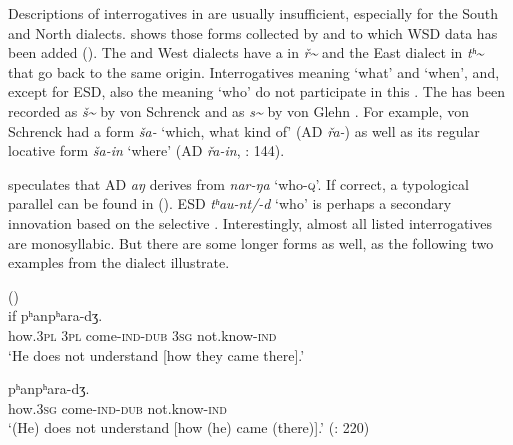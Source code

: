 Descriptions of interrogatives in  are usually insufficient, especially for the South and North  dialects.  shows those forms collected by \citet{Mattissen2003} and \citet{Fortescue2016} to which WSD data has been added (\citealt{ShiraishiTangiku2013}). The  and West  dialects have a  in \textit{ř{\textasciitilde}} and the East  dialect in \textit{tʰ}\textit{{\textasciitilde}} that go back to the same origin. Interrogatives meaning ‘what’ and ‘when’, and, except for ESD, also the  meaning ‘who’ do not participate in this . The  has been recorded as \textit{š{\textasciitilde}} by von Schrenck and as \textit{s{\textasciitilde}} by von Glehn \citep{Grube1892}. For example, von Schrenck had a form \textit{ša-} ‘which, what kind of’ (AD \textit{řa-}) as well as its regular locative form \textit{ša-in} ‘where’ (AD \textit{řa-in}, \citealt{Fortescue2011}: 144).

\citet[111]{Fortescue2016} speculates that AD \textit{aŋ} derives from \textit{nar-ŋa} ‘who-\textsc{q}’. If correct, a typological parallel can be found in  ().  ESD \textit{tʰ}\textit{au-nt/-d} ‘who’ is perhaps a secondary innovation based on the selective . Interestingly, almost all listed interrogatives are monosyllabic. But there are some longer forms as well, as the following two examples from the  dialect illustrate.

\ea%
    \label{ex:amur:12}
     ()\\
    \ea
     if  pʰanpʰara-dʒ.\\
    how.3\textsc{pl}  3\textsc{pl}  come-\textsc{ind}-\textsc{dub}    3\textsc{sg}  not.know-\textsc{ind}\\
    \glt ‘He does not understand [how they came there].’

    \ex
     pʰanpʰara-dʒ.\\
    how.3\textsc{sg}  come-\textsc{ind}-\textsc{dub}    not.know-\textsc{ind}\\
    \glt ‘(He) does not understand [how (he) came (there)].’ (\citealt{NedjalkovOtaina2013}: 220)
    \z
    \z

